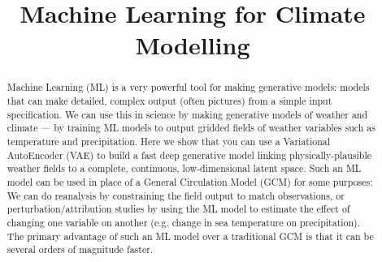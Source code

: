 \documentclass[gmd]{copernicus}
\begin{document}
\title{Machine Learning for Climate Modelling}











\received{}
\pubdiscuss{} %
\revised{}
\accepted{}
\published{}



\maketitle

\begin{abstract}
Machine Learning (ML) is a very powerful tool for making generative models: models that can make detailed, complex output (often pictures) from a simple input specification. We can use this in science by making generative models of weather and climate --- by training ML models to output gridded fields of weather variables such as temperature and precipitation. Here we show that you can use a Variational AutoEncoder (VAE) to build a fast deep generative model linking physically-plausible weather fields to a complete, continuous, low-dimensional latent space. Such an ML model can be used in place of a General Circulation Model (GCM) for some purposes: We can do reanalysis by constraining the field output to match observations, or perturbation/attribution studies by using the ML model to estimate the effect of changing one variable on another (e.g. change in sea temperature on precipitation). The primary advantage of such an ML model over a traditional GCM is that it can be several orders of magnitude faster.
\end{abstract}




\introduction  %
\end{document}
